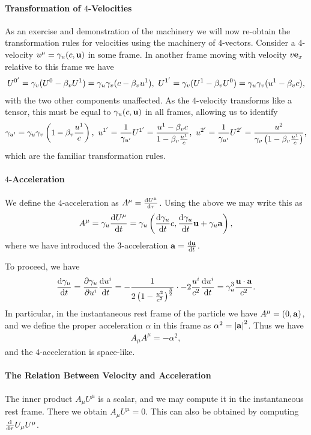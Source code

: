 \paragraph{Transformation of $4$-Velocities}
As an exercise and demonstration of the machinery we will now re-obtain the transformation rules for velocities using the machinery of $4$-vectors. Consider a $4$-velocity $u^{\mu} = \gamma_{u}(c, \vb{u})$ in some frame. In another frame moving with velocity $v\vb{e}_{x}$ relative to this frame we have
\begin{align*}
	U^{0^{\prime}} = \gamma_{v}(U^{0} - \beta_{v}U^{1}) = \gamma_{u}\gamma_{v}(c - \beta_{v}u^{1}),\ U^{1^{\prime}} = \gamma_{v}(U^{1} - \beta_{v}U^{0}) = \gamma_{u}\gamma_{v}(u^{1} - \beta_{v}c),
\end{align*}
with the two other components unaffected. As the $4$-velocity transforms like a tensor, this must be equal to $\gamma_{u}(c, \vb{u})$ in all frames, allowing us to identify
\begin{align*}
	\gamma_{u^{\prime}} = \gamma_{u}\gamma_{v}\left(1 - \beta_{v}\frac{u^{1}}{c}\right),\ u^{1^{\prime}} = \frac{1}{\gamma_{u^{\prime}}}U^{1^{\prime}} = \frac{u^{1} - \beta_{v}c}{1 - \beta_{v}\frac{u^{1}}{c}},\ u^{2^{\prime}} = \frac{1}{\gamma_{u^{\prime}}}U^{2^{\prime}} = \frac{u^{2}}{\gamma_{v}\left(1 - \beta_{v}\frac{u^{1}}{c}\right)},
\end{align*}
which are the familiar transformation rules.

\paragraph{$4$-Acceleration}
We define the $4$-acceleration as $A^{\mu} = \dv{U^{\mu}}{\tau}$. Using the above we may write this as
\begin{align*}
	A^{\mu} = \gamma_{u}\dv{U^{\mu}}{t} = \gamma_{u}\left(\dv{\gamma_{u}}{t}c, \dv{\gamma_{u}}{t}\vb{u} + \gamma_{u}\vb{a}\right),
\end{align*}
where we have introduced the $3$-acceleration $\vb{a} = \dv{\vb{u}}{t}$.

To proceed, we have
\begin{align*}
	\dv{\gamma_{u}}{t} = \pdv{\gamma_{u}}{u^{i}}\dv{u^{i}}{t} = -\frac{1}{2\left(1 - \frac{u^{2}}{c^{2}}\right)^{\frac{3}{2}}}\cdot -2\frac{u^{i}}{c^{2}}\dv{u^{i}}{t} = \gamma_{u}^{3}\frac{\vb{u}\cdot\vb{a}}{c^{2}}.
\end{align*}
In particular, in the instantaneous rest frame of the particle we have $A^{\mu} = (0, \vb{a})$, and we define the proper acceleration $\alpha$ in this frame as $\alpha^{2} = \abs{\vb{a}}^{2}$. Thus we have
\begin{align*}
	A_{\mu}A^{\mu} = -\alpha^{2},
\end{align*}
and the $4$-acceleration is space-like.

\paragraph{The Relation Between Velocity and Acceleration}
The inner product $A_{\mu}U^{\mu}$ is a scalar, and we may compute it in the instantaneous rest frame. There we obtain $A_{\mu}U^{\mu} = 0$. This can also be obtained by computing $\dv{\tau}U_{\mu}U^{\mu}$.